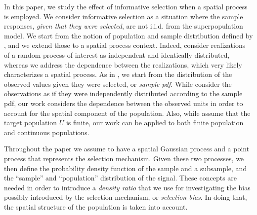 In this paper, we study the effect of informative selection when a spatial process is employed. We consider informative selection as a situation where the sample responses, \emph{given that they were selected}, are not i.i.d. from the superpopulation model. We start from the notion of population and sample distribution defined by \cite{pfefferman_1992}, and we extend those to a spatial process context. Indeed, \cite{pfefferman_1992} consider realizations of a random process of interest as independent and identically distributed, whereas we address the dependence between the realizations, which very likely characterizes a spatial process. As in \cite{pfeffermann1998parametric}, we start from the distribution of the observed values given they were selected, or \emph{sample pdf}. While \cite{pfeffermann1998parametric} consider the observations as if they were independently distributed according to the sample pdf, our work considers the dependence between the observed units in order to account for the spatial component of the population. Also, while \cite{pfeffermann1998parametric} assume that the target population $U$ is finite, our work can be applied to both finite population and continuous populations.

Throughout the paper we assume to have a spatial Gaussian process and a point process that represents the selection mechanism. Given these two processes, we then define the probability density function of the sample and a subsample, and the ``sample'' and ``population'' distribution of the signal. These concepts are needed in order to introduce a \emph{density ratio} that we use for investigating the bias possibly introduced by the selection mechanism, or \emph{selection bias}. In doing that, the spatial structure of the population is taken into account.

